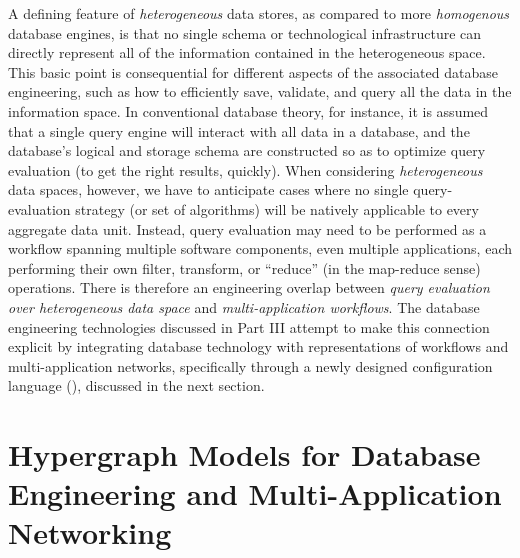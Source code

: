 \documentclass[11pt,letterpaper]{article}
\let\OldPart\part
\renewcommand{\part}[1]{\OldPart{#1}%
\vspace{-.5em}}
\newcommand{\ATextCClr}[1]{\textcolor{atcColor}{\textbf{#1}}}
\newcommand{\HMCL}{{\resizebox{!}{7.5pt}{\ATextCClr{HMCL}}}}
\newcommand{\p}[1]{

\vspace{1em}#1}
\newcommand{\q}[1]{{\fontfamily{qcr}\selectfont ``}#1{\fontfamily{qcr}\selectfont ''}}
\begin{document}
{\p{A defining feature of \textit{heterogeneous} 
data stores, as compared to more \textit{homogenous} 
database engines, is that no single schema or 
technological infrastructure can directly 
represent all of the information contained 
in the heterogeneous space.  This basic 
point is consequential for different aspects 
of the associated database engineering, such as 
how to efficiently save, validate, and query 
all the data in the information space.  
In conventional database theory, for instance, 
it is assumed that a single query engine 
will interact with all data in a database, 
and the database's logical and storage 
schema are constructed so as to optimize 
query evaluation (to get the right results, 
quickly).  When considering 
\textit{heterogeneous} data spaces, however, 
we have to anticipate cases where no 
single query-evaluation strategy 
(or set of algorithms) will be natively 
applicable to every aggregate data unit.  
Instead, query evaluation may need to 
be performed as a workflow spanning 
multiple software components, even multiple 
applications, each performing their 
own filter, transform, or \q{reduce} 
(in the map-reduce sense) operations. 
There is therefore an engineering overlap 
between \textit{query evaluation over 
heterogeneous data space} and 
\textit{multi-application workflows}.  
The database engineering technologies 
discussed in Part III attempt to 
make this connection explicit by 
integrating database technology with 
representations of workflows and 
multi-application networks, 
specifically through a newly 
designed configuration language 
(\HMCL{}), discussed in the next section.}


\part{Hypergraph Models for Database Engineering and 
Multi-Application Networking}

}
\end{document}
